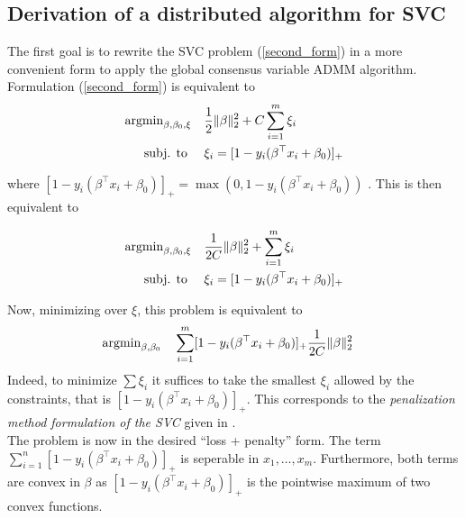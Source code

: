 \documentclass[11pt]{article}
\begin{document}
\subsection{Derivation of a distributed algorithm for SVC}

The first goal is to rewrite the SVC problem (\ref{second_form}) in a more convenient form to apply 
the global consensus variable ADMM algorithm. Formulation (\ref{second_form}) is equivalent to \\

\begin{equation*} 
\begin{aligned}
    \operatorname{argmin}_{\beta, \beta_0, \xi} \quad &   \frac{1}{2} \|\beta\|_2^2 + C\sum_{i=1}^m \xi_i\\
    \textrm{subj. to } \quad & \xi_i =  [1 - y_i (\beta^\top x_i + \beta_0)]_+
\end{aligned}
\end{equation*}

where  $[1 - y_i (\beta^\top x_i + \beta_0)]_+ = \max(0, 1 - y_i (\beta^\top x_i + \beta_0))$ . This is then equivalent to

\begin{equation*} 
\begin{aligned}
        \operatorname{argmin}_{\beta, \beta_0, \xi} \quad & \frac{1}{2C} \|\beta\|_2^2 + \sum_{i=1}^m \xi_i\\
        \textrm{subj. to } \quad & \xi_i =  [1 - y_i (\beta^\top x_i + \beta_0)]_+
\end{aligned}
\end{equation*}

Now, minimizing over $\xi$, this problem is equivalent to
\begin{equation} \label{third_formulation}
\begin{aligned}
        \operatorname{argmin}_{\beta, \beta_0} \quad 
        &  \sum_{i=1}^m [1 - y_i (\beta^\top x_i + \beta_0)]_+ \frac{1}{2C} \|\beta\|_2^2 
\end{aligned}
\end{equation}
Indeed, to minimize $\sum \xi_i$ it suffices to take the smallest $\xi_i$ allowed by the constraints,
that is $[1 - y_i (\beta^\top x_i + \beta_0)]_+$. This corresponds to the \emph{penalization method
formulation of the SVC} given in \cite{hastie2009elements}. \\

The problem is now in the desired ``loss + penalty'' form. The term $\sum_{i=1}^n [1 - y_i (\beta^\top x_i + \beta_0)]_+$  is seperable in $x_1, \ldots, x_m$. 
Furthermore, both terms are convex in $\beta$ as $[1 - y_i (\beta^\top x_i + \beta_0)]_+$ is the pointwise maximum of two convex functions. \\
\end{document}
